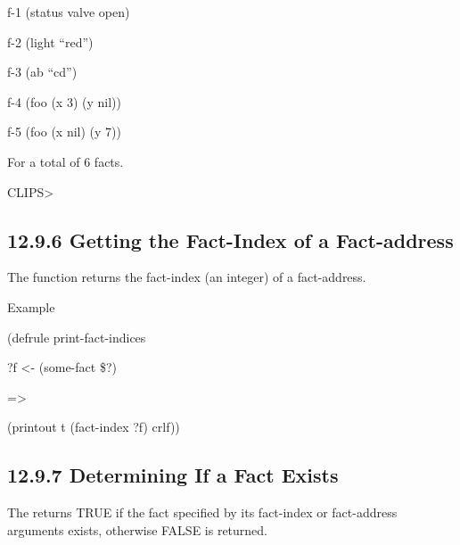 \documentclass[letterpaper,10pt,english]{sphinxmanual}
\begin{document}
f-1 (status valve open)

f-2 (light “red”)

f-3 (ab “cd”)

f-4 (foo (x 3) (y nil))

f-5 (foo (x nil) (y 7))

For a total of 6 facts.

CLIPS\textgreater{}


\subsection{12.9.6 Getting the Fact-Index of a Fact-address}
\label{\detokenize{actions:getting-the-fact-index-of-a-fact-address}}
The  function returns the fact-index (an integer) of a
fact-address.


\begin{sphinxVerbatim}[commandchars=\\\{\}]
 
\end{sphinxVerbatim}

Example

\begin{DUlineblock}{0em}
\item[] (defrule print-fact-indices
\item[] ?f \textless{}- (some-fact \$?)
\item[] =\textgreater{}
\item[] (printout t (fact-index ?f) crlf))
\end{DUlineblock}


\subsection{12.9.7 Determining If a Fact Exists}
\label{\detokenize{actions:determining-if-a-fact-exists}}
The  returns TRUE if the fact specified by its fact-index
or fact-address arguments exists, otherwise FALSE is returned.


\begin{sphinxVerbatim}[commandchars=\\\{\}]
 
\end{sphinxVerbatim}
\end{document}
